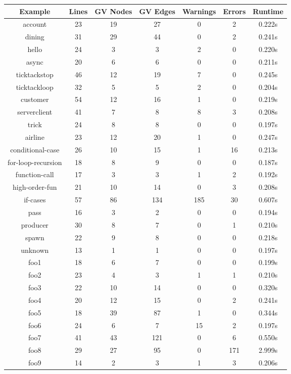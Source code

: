 \begin{table}[h]
\centering
\begin{tabular}{|c|c|c|c|c|c|c|}
\hline
Example & Lines & GV Nodes & GV Edges & Warnings & Errors & Runtime \\ 
\hline
account & 23 & 19 & 27 & 0 & 2 & 0.222s \\ 
dining & 31 & 29 & 44 & 0 & 2 & 0.241s \\ 
hello & 24 & 3 & 3 & 2 & 0 & 0.220s \\ 
async & 20 & 6 & 6 & 0 & 0 & 0.211s \\ 
ticktackstop & 46 & 12 & 19 & 7 & 0 & 0.245s \\ 
ticktackloop & 32 & 5 & 5 & 2 & 0 & 0.204s \\ 
customer & 54 & 12 & 16 & 1 & 0 & 0.219s \\ 
serverclient & 41 & 7 & 8 & 8 & 3 & 0.208s \\ 
trick & 24 & 8 & 8 & 0 & 0 & 0.197s \\ 
airline & 23 & 12 & 20 & 1 & 0 & 0.247s \\ 
conditional-case & 26 & 10 & 15 & 1 & 16 & 0.213s \\ 
for-loop-recursion & 18 & 8 & 9 & 0 & 0 & 0.187s \\ 
function-call & 17 & 3 & 3 & 1 & 2 & 0.192s \\ 
high-order-fun & 21 & 10 & 14 & 0 & 3 & 0.208s \\ 
if-cases & 57 & 86 & 134 & 185 & 30 & 0.607s \\ 
pass & 16 & 3 & 2 & 0 & 0 & 0.194s \\ 
producer & 30 & 8 & 7 & 0 & 1 & 0.210s \\ 
spawn & 22 & 9 & 8 & 0 & 0 & 0.218s \\ 
unknown & 13 & 1 & 1 & 0 & 0 & 0.197s \\ 
foo1 & 18 & 6 & 7 & 0 & 0 & 0.199s \\ 
foo2 & 23 & 4 & 3 & 1 & 1 & 0.210s \\ 
foo3 & 22 & 10 & 14 & 0 & 0 & 0.320s \\ 
foo4 & 20 & 12 & 15 & 0 & 2 & 0.241s \\ 
foo5 & 18 & 39 & 87 & 1 & 0 & 0.344s \\ 
foo6 & 24 & 6 & 7 & 15 & 2 & 0.197s \\ 
foo7 & 41 & 43 & 121 & 0 & 6 & 0.550s \\ 
foo8 & 29 & 27 & 95 & 0 & 171 & 2.999s \\ 
foo9 & 14 & 2 & 3 & 1 & 3 & 0.206s \\ 

\end{tabular}
\end{table}
